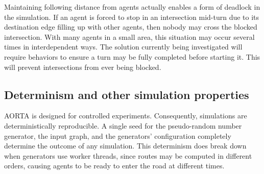 \documentclass[letterpaper, 10 pt, conference]{ieeeconf}  %
\begin{document}
Maintaining following distance from agents actually enables a form of deadlock
in the simulation. If an agent is forced to stop in an intersection mid-turn due
to its destination edge filling up with other agents, then nobody may cross the
blocked intersection. With many agents in a small area, this situation may
occur several times in interdependent ways. The solution currently being
investigated will require behaviors to ensure a turn may be fully completed
before starting it. This will prevent intersections from ever being blocked.






\subsection{Determinism and other simulation properties}

AORTA is designed for controlled experiments. Consequently, simulations are
deterministically reproducible. A single seed for the pseudo-random number
generator, the input graph, and the generators' configuration completely
determine the outcome of any simulation. This determinism does break down when
generators use worker threads, since routes may be computed in different orders,
causing agents to be ready to enter the road at different times.
\end{document}
